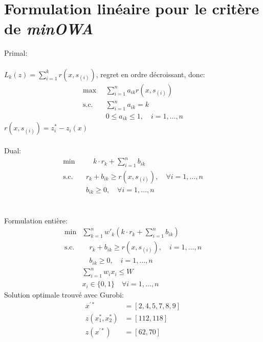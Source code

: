 \documentclass[10pt,a4paper]{report}
\begin{document}
\section{Formulation linéaire pour le critère de \textit{minOWA}}
Primal:\\\\
$L_k(z)=\sum_{i=1}^{k} r(x,s_{(i)})$, regret en ordre décroissant, donc:\\
\begin{align*}
    \max &\sum_{i=1}^n a_{ik} r(x,s_{(i)})\\
\text{s.c.} \quad & \sum_{i=1}^{n} a_{ik} = k \\
& 0 \leq a_{ik} \leq 1, \quad i = 1, \dots, n
\end{align*}
$r(x,s_{(i)}) = z_i^*-z_i(x)$\\\\
Dual:
\begin{align*}
\min & \quad k \cdot r_k + \sum_{i=1}^{n} b_{ik} \\
\text{s.c.} \quad & r_k + b_{ik} \geq r(x,s_{(i)}), \quad \forall i = 1, \dots, n \\
& b_{ik} \geq 0, \quad \forall i = 1, \dots, n
\end{align*}\\\\
Formulation entière:
\begin{align*}
\min &\sum_{k=1}^n w'_k \left( k \cdot r_k + \sum_{i=1}^n b_{ik} \right) \\
\text{s.c.} & \quad r_k + b_{ik} \geq r(x,s_{(i)}), \quad i = 1, \dots, n \\
& \quad b_{ik} \geq 0, \quad i = 1, \dots, n \\
& \sum_{i=1}^{n} w_i x_i \leq W\\
&x_i\in\{0,1\}\quad \forall i=1, \dots,n
\end{align*}
Solution optimale trouvé avec Gurobi:
\begin{align*}
	x^{'*} 	&= [2, 4, 5, 7, 8, 9]\\
	z(x_1^*,x_2^*) &= [112,118]\\ 
	z(x^{'*}) 	&= [62,70]
\end{align*}
\end{document}
